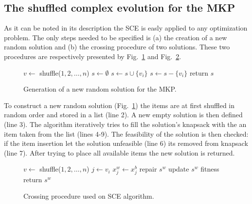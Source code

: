 \subsection{The shuffled complex evolution for the MKP}

As it can be noted in its description the SCE is easly applied to any
optimization problem.
The only steps needed to be specified is (a) the creation of a new random
solution and (b) the crossing procedure of two solutions.
These two procedures are respectively presented by Fig.~\ref{alg:new} and
Fig.~\ref{alg:cross}.

\begin{figure}
\begin{algorithmic}[1]
    \State $v \leftarrow $ shuffle($1, 2, \ldots, n$)
	\State $s \leftarrow \emptyset$ 
	  \State $s \leftarrow s \cup \{v_i\}$ 
	   
	    \State $s \leftarrow s - \{v_i\}$
      \EndIf
	\EndFor
  \State return $s$
  \EndProcedure
\end{algorithmic}
\caption{Generation of a new random solution for the MKP.}
\label{alg:new}
\end{figure}

To construct a new random solution (Fig.~\ref{alg:new}) the items are
at first shuffled in random order and stored in a list (line 2).
A new empty solution is then defined (line 3).
The algorithm iteratively tries to fill the solution's knapsack with 
the an item taken from the list (lines 4-9).
The feasibility of the solution is then checked: if the item insertion let
the solution unfeasible (line 6) its removed from knapsack (line 7).
After trying to place all available items the new solution is returned.

\begin{figure}
\begin{algorithmic}[1]
    \State $v \leftarrow $ shuffle($1, 2, \ldots, n$)
	  \State $j \leftarrow v_i$
	  \State $x^w_j \leftarrow x^b_j$ 
	\EndFor
	  \State repair $s^w$
	\EndIf
	\State update $s^w$ fitness
  \State return $s^w$
  \EndProcedure
\end{algorithmic}
\caption{Crossing procedure used on SCE algorithm.}
\label{alg:cross}
\end{figure}

